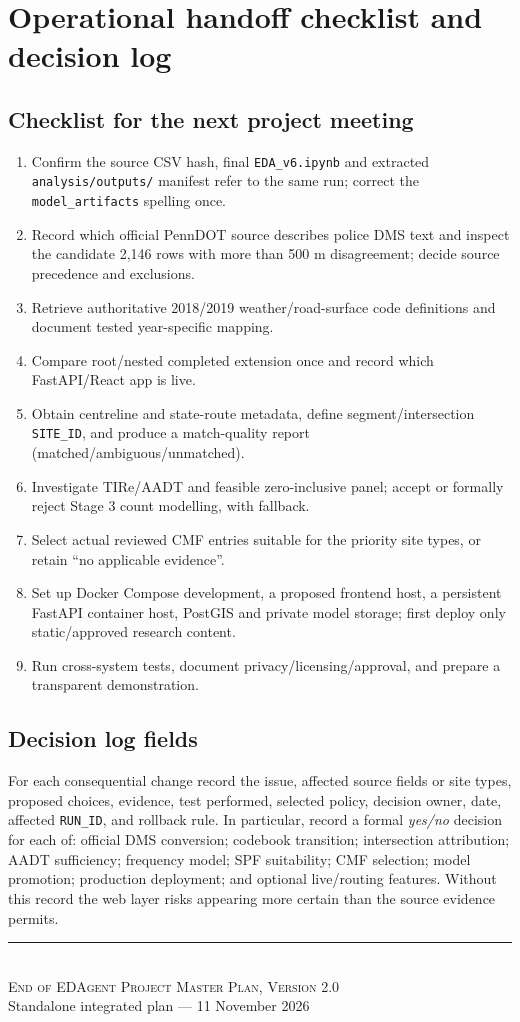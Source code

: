 \documentclass[11pt,a4paper,openany]{report}
\newcommand{\pathcode}[1]{\nolinkurl{#1}}
\begin{document}
\chapter{Operational handoff checklist and decision log}
\section{Checklist for the next project meeting}
\begin{enumerate}
\item Confirm the source CSV hash, final \pathcode{EDA_v6.ipynb} and extracted \pathcode{analysis/outputs/} manifest refer to the same run; correct the \pathcode{model_artifacts} spelling once.
\item Record which official PennDOT source describes police DMS text and inspect the candidate 2,146 rows with more than 500 m disagreement; decide source precedence and exclusions.
\item Retrieve authoritative 2018/2019 weather/road-surface code definitions and document tested year-specific mapping.
\item Compare root/nested completed extension once and record which FastAPI/React app is live.
\item Obtain centreline and state-route metadata, define segment/intersection \pathcode{SITE_ID}, and produce a match-quality report (matched/ambiguous/unmatched).
\item Investigate TIRe/AADT and feasible zero-inclusive panel; accept or formally reject Stage 3 count modelling, with fallback.
\item Select actual reviewed CMF entries suitable for the priority site types, or retain ``no applicable evidence''.
\item Set up Docker Compose development, a proposed frontend host, a persistent FastAPI container host, PostGIS and private model storage; first deploy only static/approved research content.
\item Run cross-system tests, document privacy/licensing/approval, and prepare a transparent demonstration.
\end{enumerate}

\section{Decision log fields}
For each consequential change record the issue, affected source fields or site types, proposed choices, evidence, test performed, selected policy, decision owner, date, affected \pathcode{RUN_ID}, and rollback rule. In particular, record a formal \emph{yes/no} decision for each of: official DMS conversion; codebook transition; intersection attribution; AADT sufficiency; frequency model; SPF suitability; CMF selection; model promotion; production deployment; and optional live/routing features. Without this record the web layer risks appearing more certain than the source evidence permits.

\begin{center}
\rule{.62\linewidth}{.5pt}\\[5pt]
\textsc{End of EDAgent Project Master Plan, Version 2.0}\\[3pt]
\small Standalone integrated plan --- 11 November 2026
\end{center}
\end{document}
